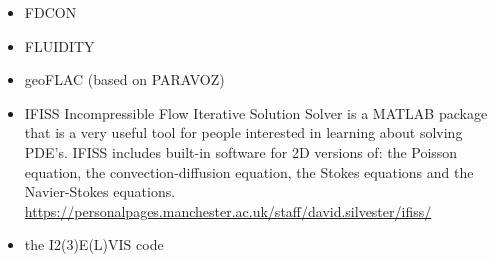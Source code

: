 \begin{itemize}
\noindent
\cite{thie11}
\cite{alht11}
\cite{alht12}
\cite{alhf13}
\cite{erhv14}
\cite{thsh14}
\cite{erhv15}
\cite{sahf18}
\cite{erhv19}

\item FDCON 

\noindent
\cite{enbs05}
\cite{crsg12}
\cite{fusc13}
\cite{fuks15}


\item FLUIDITY
\cite{dawk11}
\cite{gagd14}

\item geoFLAC (based on PARAVOZ)
\cite{jala19}

\item IFISS 
Incompressible Flow Iterative Solution Solver is a
MATLAB package that is a very useful tool for people interested in
learning about solving PDE’s.
IFISS includes built-in software for 2D versions of:
the Poisson equation, the convection-diffusion equation, the Stokes equations
and the Navier-Stokes equations.\\
\url{https://personalpages.manchester.ac.uk/staff/david.silvester/ifiss/}


\item the I2(3)E(L)VIS code 


\end{itemize}
